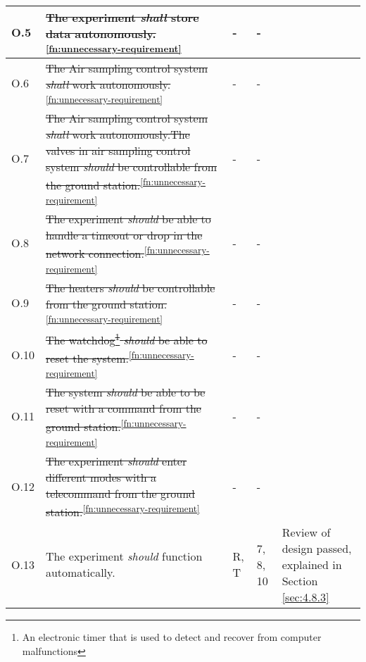 \begin{longtable}[]{|m{}| m{} |m{} |m{}|m{}|}
O.5  & \st{The experiment \textit{shall} store data autonomously.}\textsuperscript{\ref{fn:unnecessary-requirement}}                                                                                                                &       - & -            &        \\ \hline
O.6  & \st{The Air sampling control system \textit{shall} work autonomously.}\textsuperscript{\ref{fn:unnecessary-requirement}}                                                                                                     &       -     &  -          &        \\ \hline
O.7  & \st{The Air sampling control system \textit{shall} work autonomously.The valves in air sampling control system \textit{should} be controllable from the ground station.}\textsuperscript{\ref{fn:unnecessary-requirement}} &      -       &   -         &        \\ \hline
O.8  & \st{The experiment \textit{should} be able to handle a timeout or drop in the network connection.}\textsuperscript{\ref{fn:unnecessary-requirement}}                                                                         &    -         &  -  &        \\ \hline
O.9  & \st{The heaters \textit{should} be controllable from the ground station.}\textsuperscript{\ref{fn:unnecessary-requirement}}                                                                                                  &     -      &  -           &        \\ \hline
O.10 & \st{The watchdog\footnote{An electronic timer that is used to detect and recover from computer malfunctions} \textit{should} be able to reset the system.}\textsuperscript{\ref{fn:unnecessary-requirement}}               &    -        & -          &        \\ \hline
O.11 & \st{The system \textit{should} be able to be reset with a command from the ground station.}\textsuperscript{\ref{fn:unnecessary-requirement}}                                                                                &     -      & -            &        \\ \hline
O.12 & \st{The experiment \textit{should} enter different modes with a telecommand from the ground station.}\textsuperscript{\ref{fn:unnecessary-requirement}}                                                                      &      -        & -    &        \\ \hline
O.13 & The experiment \textit{should} function automatically.                                                           &      R, T        & 7, 8, 10            &    Review of design passed, explained in Section \ref{sec:4.8.3}    \\ \hline

\end{longtable}
